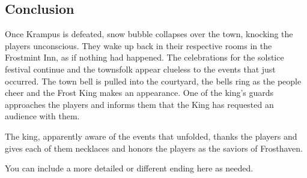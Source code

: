 \documentclass{article}
\begin{document}
\begin{multicols*}{2}


		
\section{Conclusion}

Once Krampus is defeated, snow bubble collapses over the town, knocking the players unconscious. They wake up back in their respective rooms in the Frostmint Inn, as if nothing had happened. The celebrations for the solstice festival continue and the townsfolk appear clueless to the events that just occurred. The town bell is pulled into the courtyard, the bells ring as the people cheer and the Frost King makes an appearance. One of the king's guards approaches the players and informs them that the King has requested an audience with them.

The king, apparently aware of the events that unfolded, thanks the players and gives each of them necklaces and honors the players as the saviors of Frosthaven.

You can include a more detailed or different ending here as needed.

	\pagebreak
\end{multicols*}
	
\end{document}
